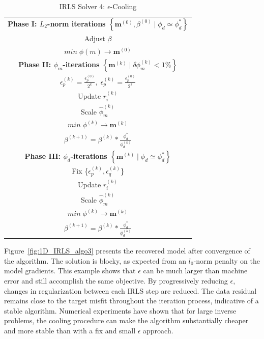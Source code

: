 \begin{table}[h!]
\centering
\caption{IRLS Solver 4: $\epsilon$-Cooling}
\label{tbl:IRLS_v4}
\renewcommand{\arraystretch}{1.5}
\begin{tabular}{|c|}\hline
\textbf{Phase I: $L_2$-norm iterations $\left\{ \mathbf{m}^{(0)}, \beta^{(0)} \mid \phi_d \simeq \phi_d^* \right \}$}\\
Adjust $\beta$ \\
$min\; \phi(m)  \rightarrow \mathbf{m}^{(0)}$ \\ \hline
\textbf{Phase II: $\phi_m$-iterations $\left\{  \mathbf{m}^{(k)} \mid \delta \phi_m^{(k)} < 1\% \right \}$ }\\
$\epsilon_p^{(k)}=\frac{\epsilon_p^{(0)}}{2^k},\;\epsilon_p^{(k)}=\frac{\epsilon_p^{(0)}}{2^k}$\\
Update $r_i^{(k)}$\\
Scale $\hat \phi_m^{(k)}$ \\
$min\; \phi^{(k)}  \rightarrow \mathbf{m}^{(k)}$\\ 
$\beta^{(k+1)}=\beta^{(k)} * \frac{\phi_d^*}{\phi_d^{(k)}} $\\ \hline
\textbf{Phase III: $\phi_d$-iterations $\left\{ \mathbf{m}^{(k)} \mid \phi_d \simeq \phi_d^* \right \}$ }\\
Fix \{$\epsilon_p^{(k)},\epsilon_q^{(k)}$\}\\
Update $r_i^{(k)}$\\
Scale $\hat \phi_m^{(k)}$ \\
$min\; \phi^{(k)}  \rightarrow \mathbf{m}^{(k)}$\\ 
$\beta^{(k+1)}=\beta^{(k)} * \frac{\phi_d^*}{\phi_d^{(k)}} $\\ \hline
\end{tabular}
\end{table}

Figure~\ref{fig:1D_IRLS_algo3} presents the recovered model after convergence of the algorithm. 
The solution is blocky, as expected from an $l_0$-norm penalty on the model gradients. 
This example shows that $\epsilon$ can be much larger than machine error and still accomplish the same objective. 
By progressively reducing $\epsilon$, changes in regularization between each IRLS step are reduced.
The data residual remains close to the target misfit throughout the iteration process, indicative of a stable algorithm. 
Numerical experiments have shown that for large inverse problems, the cooling procedure can make the algorithm substantially cheaper and more stable than with a fix and small $\epsilon$ approach.

